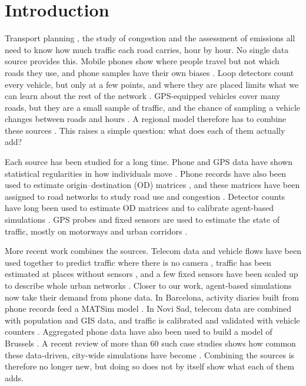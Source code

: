 \documentclass[preprint,11pt,a4paper]{elsarticle}
\begin{document}
\onehalfspacing
\linenumbers

\section{Introduction}
\label{sec:intro}

Transport planning \cite{toole2015}, the study of congestion \cite{colak2016} and the assessment of emissions \cite{grujic2022} all need to know how much traffic each road carries, hour by hour. No single data source provides this. Mobile phones show where people travel \cite{gonzalez2008,calabrese2011} but not which roads they use, and phone samples have their own biases \cite{wesolowski2013}. Loop detectors count every vehicle, but only at a few points, and where they are placed limits what we can learn about the rest of the network \cite{yang1998,castillo2008,gentili2012,castillo2015}. GPS-equipped vehicles cover many roads, but they are a small sample of traffic, and the chance of sampling a vehicle changes between roads and hours \cite{herrera2010,jenelius2013,patire2015}. A regional model therefore has to combine these sources \cite{elfaouzi2011,zheng2014,chen2016,anda2017}. This raises a simple question: what does each of them actually add?

Each source has been studied for a long time. Phone and GPS data have shown statistical regularities in how individuals move \cite{bazzani2010,gallotti2016,mizzi2018,mizzi2022,mizzi2023}. Phone records have also been used to estimate origin--destination (OD) matrices \cite{iqbal2014,alexander2015}, and these matrices have been assigned to road networks \cite{wardrop1952} to study road use and congestion \cite{wang2012,toole2015,colak2016}. Detector counts have long been used to estimate OD matrices \cite{cascetta1984,yang1992,antoniou2016} and to calibrate agent-based simulations \cite{flotterod2011}. GPS probes and fixed sensors are used to estimate the state of traffic, mostly on motorways and urban corridors \cite{wang2005,work2010,bachmann2013,seo2015,nantes2016,seo2017}.

More recent work combines the sources. Telecom data and vehicle flows have been used together to predict traffic where there is no camera \cite{lin2024}, traffic has been estimated at places without sensors \cite{lei2024}, and a few fixed sensors have been scaled up to describe whole urban networks \cite{maiti2025}. Closer to our work, agent-based simulations now take their demand from phone data. In Barcelona, activity diaries built from phone records feed a MATSim model \cite{bassolas2019}. In Novi Sad, telecom data are combined with population and GIS data, and traffic is calibrated and validated with vehicle counters \cite{grujic2022}. Aggregated phone data have also been used to build a model of Brussels \cite{li2024}. A recent review of more than 60 such case studies shows how common these data-driven, city-wide simulations have become \cite{bochenina2025}. Combining the sources is therefore no longer new, but doing so does not by itself show what each of them adds.
\end{document}

